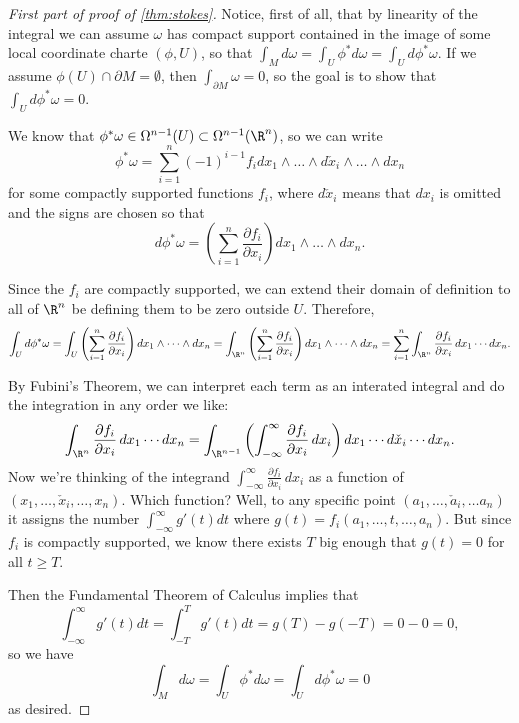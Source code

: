 \begin{proof}[{First part of proof of \cref{thm:stokes}}]
	Notice, first of all, that by linearity of the integral we can assume $\omega$ has compact support contained in the image of some local coordinate charte $(\phi,U)$, so that $\int_M d\omega = \int_U \phi^\ast d\omega = \int_U d\phi^\ast \omega$. If we assume $\phi(U) \cap \partial M = \emptyset$, then $\int_{\partial M} \omega = 0$, so the goal is to show that $\int_U d\phi^\ast \omega = 0$.
	
	We know that $\phi^\ast \omega \in \Omega^{n-1}(U) \subset \Omega^{n-1}(\R^n)$, so we can write
	\[
		\phi^\ast \omega = \sum_{i=1}^n (-1)^{i-1} f_i dx_1 \wedge \dots \wedge d\check{x}_i \wedge \dots \wedge dx_n
	\]
	for some compactly supported functions $f_i$, where $d\check{x}_i$ means that $dx_i$ is omitted and the signs are chosen so that
	\[
		d\phi^\ast \omega = \left(\sum_{i=1}^n \frac{\partial f_i}{\partial x_i} \right) dx_1 \wedge \dots \wedge dx_n.
	\]
	
	Since the $f_i$ are compactly supported, we can extend their domain of definition to all of $\R^n$ be defining them to be zero outside $U$. Therefore,
	\[
		\int_U d\phi^\ast \omega = \int_U \left(\sum_{i=1}^n \frac{\partial f_i}{\partial x_i} \right) dx_1 \wedge \dots \wedge dx_n = \int_{\R^n} \left(\sum_{i=1}^n \frac{\partial f_i}{\partial x_i} \right) dx_1 \wedge \dots \wedge dx_n = \sum_{i=1}^n\int_{\R^n} \frac{\partial f_i}{\partial x_i}\,  dx_1 \cdots dx_n.
	\]
	
	By Fubini's Theorem, we can interpret each term as an interated integral and do the integration in any order we like:
	\[
		\int_{\R^n} \frac{\partial f_i}{\partial x_i} \, dx_1 \cdots dx_n = \int_{\R^{n-1}} \left(\int_{-\infty}^\infty \frac{\partial f_i}{\partial x_i} \, dx_i\right) dx_1 \cdots d\check{x}_i \cdots dx_n.
	\]
	Now we're thinking of the integrand $\int_{-\infty}^\infty \frac{\partial f_i}{\partial x_i} \, dx_i$ as a function of $(x_1, \dots , \check{x}_i, \dots , x_n)$. Which function? Well, to any specific point $(a_1, \dots, \check{a}_i, \dots a_n)$ it assigns the number $\int_{-\infty}^\infty g'(t)dt$ where $g(t) = f_i(a_1, \dots , t, \dots , a_n)$. But since $f_i$ is compactly supported, we know there exists $T$ big enough that $g(t) = 0$ for all $t \geq T$. 
	
	Then the Fundamental Theorem of Calculus implies that
	\[
		\int_{-\infty}^\infty g'(t) dt = \int_{-T}^T g'(t)dt = g(T) - g(-T) = 0-0=0,
	\]
	so we have
	\[
		\int_M d\omega = \int_U \phi^\ast d\omega = \int_U d\phi^\ast \omega = 0
	\]
	as desired.
\end{proof}

